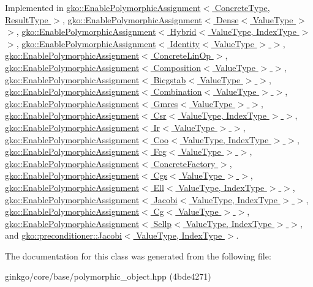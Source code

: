 Implemented in \hyperlink{classgko_1_1EnablePolymorphicAssignment_a0a4cf244139e7761d6a91c61e029810e}{gko\+::\+Enable\+Polymorphic\+Assignment$<$ Concrete\+Type, Result\+Type $>$}, \hyperlink{classgko_1_1EnablePolymorphicAssignment_a0a4cf244139e7761d6a91c61e029810e}{gko\+::\+Enable\+Polymorphic\+Assignment$<$ Dense$<$ Value\+Type $>$ $>$}, \hyperlink{classgko_1_1EnablePolymorphicAssignment_a0a4cf244139e7761d6a91c61e029810e}{gko\+::\+Enable\+Polymorphic\+Assignment$<$ Hybrid$<$ Value\+Type, Index\+Type $>$ $>$}, \hyperlink{classgko_1_1EnablePolymorphicAssignment_a0a4cf244139e7761d6a91c61e029810e}{gko\+::\+Enable\+Polymorphic\+Assignment$<$ Identity$<$ Value\+Type $>$ $>$}, \hyperlink{classgko_1_1EnablePolymorphicAssignment_a0a4cf244139e7761d6a91c61e029810e}{gko\+::\+Enable\+Polymorphic\+Assignment$<$ Concrete\+Lin\+Op $>$}, \hyperlink{classgko_1_1EnablePolymorphicAssignment_a0a4cf244139e7761d6a91c61e029810e}{gko\+::\+Enable\+Polymorphic\+Assignment$<$ Composition$<$ Value\+Type $>$ $>$}, \hyperlink{classgko_1_1EnablePolymorphicAssignment_a0a4cf244139e7761d6a91c61e029810e}{gko\+::\+Enable\+Polymorphic\+Assignment$<$ Bicgstab$<$ Value\+Type $>$ $>$}, \hyperlink{classgko_1_1EnablePolymorphicAssignment_a0a4cf244139e7761d6a91c61e029810e}{gko\+::\+Enable\+Polymorphic\+Assignment$<$ Combination$<$ Value\+Type $>$ $>$}, \hyperlink{classgko_1_1EnablePolymorphicAssignment_a0a4cf244139e7761d6a91c61e029810e}{gko\+::\+Enable\+Polymorphic\+Assignment$<$ Gmres$<$ Value\+Type $>$ $>$}, \hyperlink{classgko_1_1EnablePolymorphicAssignment_a0a4cf244139e7761d6a91c61e029810e}{gko\+::\+Enable\+Polymorphic\+Assignment$<$ Csr$<$ Value\+Type, Index\+Type $>$ $>$}, \hyperlink{classgko_1_1EnablePolymorphicAssignment_a0a4cf244139e7761d6a91c61e029810e}{gko\+::\+Enable\+Polymorphic\+Assignment$<$ Ir$<$ Value\+Type $>$ $>$}, \hyperlink{classgko_1_1EnablePolymorphicAssignment_a0a4cf244139e7761d6a91c61e029810e}{gko\+::\+Enable\+Polymorphic\+Assignment$<$ Coo$<$ Value\+Type, Index\+Type $>$ $>$}, \hyperlink{classgko_1_1EnablePolymorphicAssignment_a0a4cf244139e7761d6a91c61e029810e}{gko\+::\+Enable\+Polymorphic\+Assignment$<$ Fcg$<$ Value\+Type $>$ $>$}, \hyperlink{classgko_1_1EnablePolymorphicAssignment_a0a4cf244139e7761d6a91c61e029810e}{gko\+::\+Enable\+Polymorphic\+Assignment$<$ Concrete\+Factory $>$}, \hyperlink{classgko_1_1EnablePolymorphicAssignment_a0a4cf244139e7761d6a91c61e029810e}{gko\+::\+Enable\+Polymorphic\+Assignment$<$ Cgs$<$ Value\+Type $>$ $>$}, \hyperlink{classgko_1_1EnablePolymorphicAssignment_a0a4cf244139e7761d6a91c61e029810e}{gko\+::\+Enable\+Polymorphic\+Assignment$<$ Ell$<$ Value\+Type, Index\+Type $>$ $>$}, \hyperlink{classgko_1_1EnablePolymorphicAssignment_a0a4cf244139e7761d6a91c61e029810e}{gko\+::\+Enable\+Polymorphic\+Assignment$<$ Jacobi$<$ Value\+Type, Index\+Type $>$ $>$}, \hyperlink{classgko_1_1EnablePolymorphicAssignment_a0a4cf244139e7761d6a91c61e029810e}{gko\+::\+Enable\+Polymorphic\+Assignment$<$ Cg$<$ Value\+Type $>$ $>$}, \hyperlink{classgko_1_1EnablePolymorphicAssignment_a0a4cf244139e7761d6a91c61e029810e}{gko\+::\+Enable\+Polymorphic\+Assignment$<$ Sellp$<$ Value\+Type, Index\+Type $>$ $>$}, and \hyperlink{classgko_1_1preconditioner_1_1Jacobi_a6d5e28b3033772bfc6c96fbe3caca003}{gko\+::preconditioner\+::\+Jacobi$<$ Value\+Type, Index\+Type $>$}.



The documentation for this class was generated from the following file\+:\begin{DoxyCompactItemize}
\item 
ginkgo/core/base/polymorphic\+\_\+object.\+hpp (4bde4271)\end{DoxyCompactItemize}
